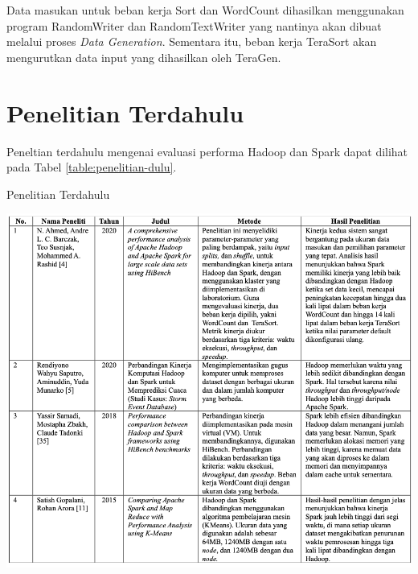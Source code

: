 Data masukan untuk beban kerja Sort dan WordCount dihasilkan menggunakan program RandomWriter dan RandomTextWriter yang nantinya akan dibuat melalui proses \textit{Data Generation}. Sementara itu, beban kerja TeraSort akan mengurutkan data input yang dihasilkan oleh TeraGen.

\section{Penelitian Terdahulu}
Peneltian terdahulu mengenai evaluasi performa Hadoop dan Spark dapat dilihat pada Tabel \ref{table:penelitian-dulu}.

\begin{table}[h]
  \centering
  \caption{Penelitian Terdahulu}
  \includegraphics[width=1\textwidth]{figures/ch02/comparison-thesis}
  \label{table:penelitian-dulu}
\end{table}
